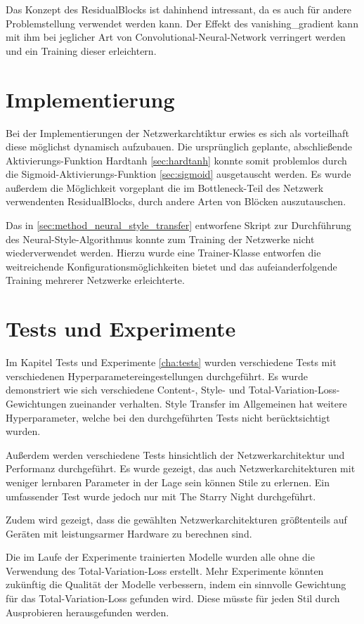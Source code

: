Das Konzept des ResidualBlocks ist dahinhend intressant, da es auch für andere Problemstellung verwendet werden kann. Der Effekt des \gls{vanishing_gradient} kann mit ihm bei jeglicher Art von Convolutional-Neural-Network verringert werden und ein Training dieser erleichtern.

\section{Implementierung}

Bei der Implementierungen der Netzwerkarchtiktur erwies es sich als vorteilhaft diese möglichst dynamisch aufzubauen. Die ursprünglich geplante, abschließende Aktivierungs-Funktion Hardtanh \ref{sec:hardtanh} konnte somit problemlos durch die Sigmoid-Aktivierungs-Funktion \ref{sec:sigmoid} ausgetauscht werden. Es wurde außerdem die Möglichkeit vorgeplant die im Bottleneck-Teil des Netzwerk verwendenten ResidualBlocks, durch andere Arten von Blöcken auszutauschen.

Das in \ref{sec:method_neural_style_transfer} entworfene Skript zur Durchführung des Neural-Style-Algorithmus konnte zum Training der Netzwerke nicht wiederverwendet werden. Hierzu wurde eine Trainer-Klasse entworfen die weitreichende Konfigurationsmöglichkeiten bietet und das aufeianderfolgende Training mehrerer Netzwerke erleichterte.

\section{Tests und Experimente}

Im Kapitel Tests und Experimente \ref{cha:tests} wurden verschiedene Tests mit verschiedenen Hyperparametereingestellungen durchgeführt.
Es wurde demonstriert wie sich verschiedene Content-, Style- und Total-Variation-Loss-Gewichtungen zueinander verhalten. Style Transfer im Allgemeinen hat weitere Hyperparameter, welche bei den durchgeführten Tests nicht berücktsichtigt wurden.

Außerdem werden verschiedene Tests hinsichtlich der Netzwerkarchitektur und Performanz durchgeführt. Es wurde gezeigt, das auch Netzwerkarchitekturen mit weniger lernbaren Parameter in der Lage sein können Stile zu erlernen. Ein umfassender Test wurde jedoch nur mit The Starry Night \cite{the_starry_night_img} durchgeführt.

Zudem wird gezeigt, dass die gewählten Netzwerkarchitekturen größtenteils auf Geräten mit leistungsarmer Hardware zu berechnen sind.

Die im Laufe der Experimente trainierten Modelle wurden alle ohne die Verwendung des Total-Variation-Loss erstellt. Mehr Experimente könnten zukünftig die Qualität der Modelle verbessern, indem ein sinnvolle Gewichtung für das Total-Variation-Loss gefunden wird. Diese müsste für jeden Stil durch Ausprobieren herausgefunden werden.